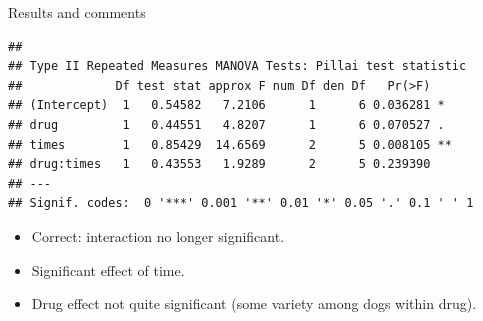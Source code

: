 \begin{frame}[fragile]{Results and comments}

{\small
 
\begin{knitrout}
\color{fgcolor}\begin{kframe}
\begin{alltt}
\end{alltt}
\begin{verbatim}
## 
## Type II Repeated Measures MANOVA Tests: Pillai test statistic
##             Df test stat approx F num Df den Df   Pr(>F)   
## (Intercept)  1   0.54582   7.2106      1      6 0.036281 * 
## drug         1   0.44551   4.8207      1      6 0.070527 . 
## times        1   0.85429  14.6569      2      5 0.008105 **
## drug:times   1   0.43553   1.9289      2      5 0.239390   
## ---
## Signif. codes:  0 '***' 0.001 '**' 0.01 '*' 0.05 '.' 0.1 ' ' 1
\end{verbatim}
\end{kframe}
\end{knitrout}
}

\begin{itemize}
\item Correct: interaction no longer significant.
\item Significant effect of time.
\item Drug effect not quite significant (some variety among dogs
  within drug).
\end{itemize}
  
\end{frame}

